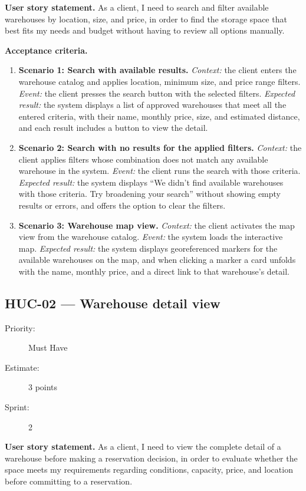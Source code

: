 \documentclass[11pt,a4paper,oneside]{report}
\begin{document}
\textbf{User story statement.} As a client, I need to search and filter available warehouses by location, size, and price, in order to find the storage space that best fits my needs and budget without having to review all options manually.

\textbf{Acceptance criteria.}
\begin{enumerate}
\item \textbf{Scenario 1: Search with available results.} \emph{Context:} the client enters the warehouse catalog and applies location, minimum size, and price range filters. \emph{Event:} the client presses the search button with the selected filters. \emph{Expected result:} the system displays a list of approved warehouses that meet all the entered criteria, with their name, monthly price, size, and estimated distance, and each result includes a button to view the detail.
\item \textbf{Scenario 2: Search with no results for the applied filters.} \emph{Context:} the client applies filters whose combination does not match any available warehouse in the system. \emph{Event:} the client runs the search with those criteria. \emph{Expected result:} the system displays ``We didn't find available warehouses with those criteria. Try broadening your search'' without showing empty results or errors, and offers the option to clear the filters.
\item \textbf{Scenario 3: Warehouse map view.} \emph{Context:} the client activates the map view from the warehouse catalog. \emph{Event:} the system loads the interactive map. \emph{Expected result:} the system displays georeferenced markers for the available warehouses on the map, and when clicking a marker a card unfolds with the name, monthly price, and a direct link to that warehouse's detail.
\end{enumerate}

\subsection{HUC-02 --- Warehouse detail view}
\label{req:HUC-02}
\begin{description}
\item[Priority:] Must Have \quad \item[Estimate:] 3 points \quad \item[Sprint:] 2
\end{description}

\textbf{User story statement.} As a client, I need to view the complete detail of a warehouse before making a reservation decision, in order to evaluate whether the space meets my requirements regarding conditions, capacity, price, and location before committing to a reservation.
\end{document}
